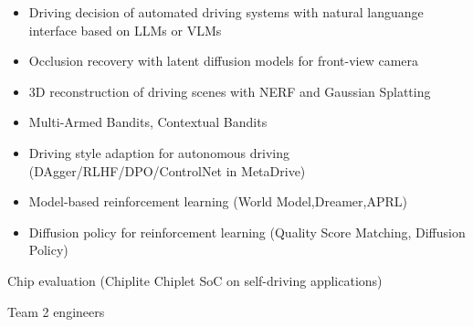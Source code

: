 \documentclass[../cv.tex]{subfiles}
\begin{document}
\begin{cventries}
{\begin{cvitems}
\begin{itemize}
				\item Driving decision of automated driving systems with natural languange interface based on LLMs or VLMs \supercite{Xin_LLM_24}  \supercite{Xin_VLM_24}
				\item Occlusion recovery with latent diffusion models for front-view camera \supercite{Xin_Latent_Diffusion_23}
				\item 3D reconstruction of driving scenes with NERF and Gaussian Splatting
				\item Multi-Armed Bandits, Contextual Bandits
				\item Driving style adaption for autonomous driving (DAgger/RLHF/DPO/ControlNet in MetaDrive)
				\item Model-based reinforcement learning (World Model,Dreamer,APRL)
				\item Diffusion policy for reinforcement learning (Quality Score Matching, Diffusion Policy)
			\end{itemize}
			\item Chip evaluation (Chiplite Chiplet SoC on self-driving applications)
			\item Team 2 engineers
		\end{cvitems}
	}


\end{cventries}
\end{document}
